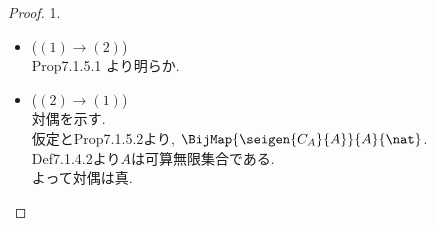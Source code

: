 \begin{proof} 1. \\
  \begin{itemize}
      \item[]\hspace{-0.5cm} ($(1) \rightarrow (2)$)\\
        Prop7.1.5.1 より明らか.
      \item[]\hspace{-0.5cm} ($(2) \rightarrow (1)$)\\
        対偶を示す.\\
        仮定とProp7.1.5.2より,
        $\BijMap {\seigen {C_A}{A}}{A}{\nat}$.\\
        Def7.1.4.2より$A$は可算無限集合である.\\
        よって対偶は真.
  \end{itemize}
\end{proof}


